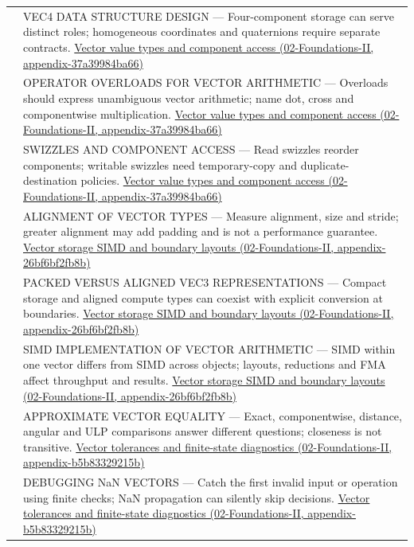 {\begin{longtable}[]{@{}
  >{\raggedright\arraybackslash}p{}
  >{\raggedright\arraybackslash}p{}@{}}
590 & VEC4 DATA STRUCTURE DESIGN --- Four-component storage can serve distinct roles; homogeneous coordinates and quaternions require separate contracts. \href{../02-Foundations-II/main.pdf\#nameddest=appendix-37a39984ba66}{Vector value types and component access (02-Foundations-II, appendix-37a39984ba66)} \\
591 & OPERATOR OVERLOADS FOR VECTOR ARITHMETIC --- Overloads should express unambiguous vector arithmetic; name dot, cross and componentwise multiplication. \href{../02-Foundations-II/main.pdf\#nameddest=appendix-37a39984ba66}{Vector value types and component access (02-Foundations-II, appendix-37a39984ba66)} \\
592 & SWIZZLES AND COMPONENT ACCESS --- Read swizzles reorder components; writable swizzles need temporary-copy and duplicate-destination policies. \href{../02-Foundations-II/main.pdf\#nameddest=appendix-37a39984ba66}{Vector value types and component access (02-Foundations-II, appendix-37a39984ba66)} \\
593 & ALIGNMENT OF VECTOR TYPES --- Measure alignment, size and stride; greater alignment may add padding and is not a performance guarantee. \href{../02-Foundations-II/main.pdf\#nameddest=appendix-26bf6bf2fb8b}{Vector storage SIMD and boundary layouts (02-Foundations-II, appendix-26bf6bf2fb8b)} \\
594 & PACKED VERSUS ALIGNED VEC3 REPRESENTATIONS --- Compact storage and aligned compute types can coexist with explicit conversion at boundaries. \href{../02-Foundations-II/main.pdf\#nameddest=appendix-26bf6bf2fb8b}{Vector storage SIMD and boundary layouts (02-Foundations-II, appendix-26bf6bf2fb8b)} \\
595 & SIMD IMPLEMENTATION OF VECTOR ARITHMETIC --- SIMD within one vector differs from SIMD across objects; layouts, reductions and FMA affect throughput and results. \href{../02-Foundations-II/main.pdf\#nameddest=appendix-26bf6bf2fb8b}{Vector storage SIMD and boundary layouts (02-Foundations-II, appendix-26bf6bf2fb8b)} \\
596 & APPROXIMATE VECTOR EQUALITY --- Exact, componentwise, distance, angular and ULP comparisons answer different questions; closeness is not transitive. \href{../02-Foundations-II/main.pdf\#nameddest=appendix-b5b83329215b}{Vector tolerances and finite-state diagnostics (02-Foundations-II, appendix-b5b83329215b)} \\
597 & DEBUGGING NaN VECTORS --- Catch the first invalid input or operation using finite checks; NaN propagation can silently skip decisions. \href{../02-Foundations-II/main.pdf\#nameddest=appendix-b5b83329215b}{Vector tolerances and finite-state diagnostics (02-Foundations-II, appendix-b5b83329215b)} \\

\end{longtable}}
